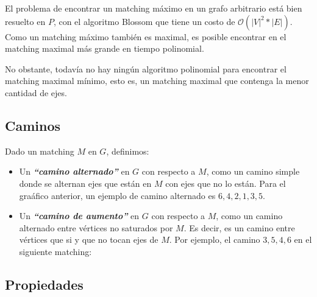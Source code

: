 El problema de encontrar un matching m\'aximo en un grafo arbitrario est\'a bien resuelto en $P$, con el algoritmo Blossom que tiene un costo de $\mathcal{O}(|V|^2 * |E|)$. Como un matching m\'aximo tambi\'en es maximal, es posible encontrar en el matching maximal m\'as grande en tiempo polinomial.

No obstante, todav\'ia no hay ning\'un algoritmo polinomial para encontrar el matching maximal m\'inimo, esto es, un matching maximal que contenga la menor cantidad de ejes.

\newpage
\subsection{Caminos}

Dado un matching $M$ en $G$, definimos:

\begin{itemize}
\item Un \textbf{\emph{``camino alternado''}} en $G$ con respecto a $M$, como un camino simple donde se alternan ejes que est\'an en $M$ con ejes que no lo est\'an. Para el gra\'afico anterior, un ejemplo de camino alternado es $6,4,2,1,3,5$.
\item Un \textbf{\emph{``camino de aumento''}} en $G$ con respecto a $M$, como un camino alternado entre v\'ertices no saturados por $M$. Es decir, es un camino entre v\'ertices que si y que no tocan ejes de $M$. Por ejemplo, el camino $3,5,4,6$ en el siguiente matching:

\raggedright
\bigskip
\begin{center}
\end{center}
\raggedright
\bigskip

\end{itemize}

\subsection{Propiedades}

